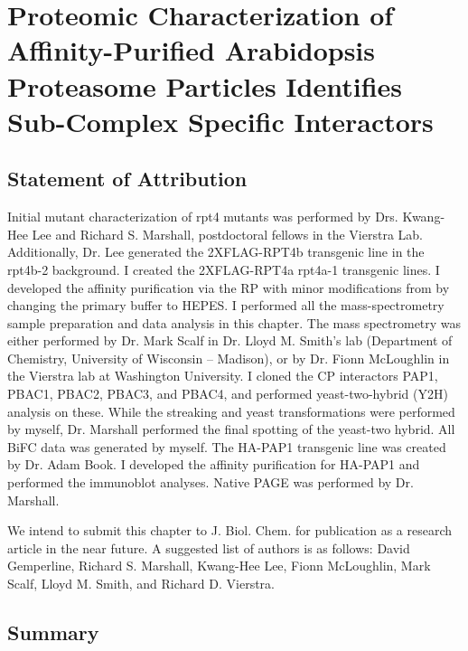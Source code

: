 \chapter{Proteomic Characterization of Affinity-Purified Arabidopsis Proteasome Particles Identifies Sub-Complex Specific Interactors }

\section{Statement of Attribution}
Initial mutant characterization of rpt4 mutants was performed by Drs. Kwang-Hee Lee and Richard S. Marshall, postdoctoral fellows in the Vierstra Lab. Additionally, Dr. Lee generated the 2XFLAG-RPT4b transgenic line in the rpt4b-2 background.  I created the 2XFLAG-RPT4a rpt4a-1 transgenic lines. I developed the affinity purification via the RP with minor modifications from \citep{book10} by changing the primary buffer to HEPES. I performed all the mass-spectrometry sample preparation and data analysis in this chapter.  The mass spectrometry was either performed by Dr. Mark Scalf in Dr. Lloyd M. Smith’s lab (Department of Chemistry, University of Wisconsin – Madison), or by Dr. Fionn McLoughlin in the Vierstra lab at Washington University.  I cloned the CP interactors PAP1, PBAC1, PBAC2, PBAC3, and PBAC4, and performed yeast-two-hybrid (Y2H) analysis on these.  While the streaking and yeast transformations were performed by myself, Dr. Marshall performed the final spotting of the yeast-two hybrid.  All BiFC data was generated by myself.  The HA-PAP1 transgenic line was created by Dr. Adam Book.  I developed the affinity purification for HA-PAP1 and performed the immunoblot analyses.  Native PAGE was performed by Dr. Marshall.



We intend to submit this chapter to J. Biol. Chem. for publication as a research article in the near future.  A suggested list of authors is as follows: David Gemperline, Richard S. Marshall, Kwang-Hee Lee, Fionn McLoughlin, Mark Scalf, Lloyd M. Smith, and Richard D. Vierstra. 

\section{Summary}

